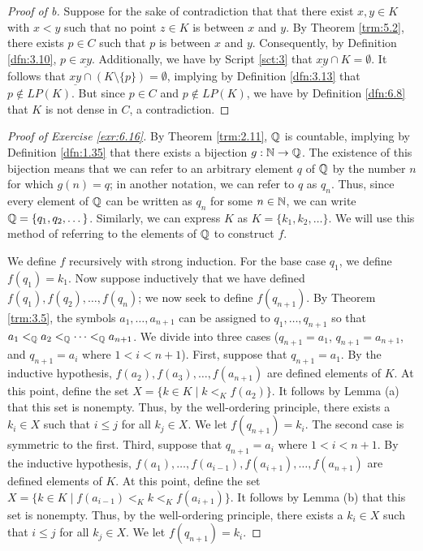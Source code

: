 \documentclass[../main.tex]{subfiles}
\begin{document}
\begin{exercise}
\begin{lemma*}
\begin{proof}[Proof of b]
            Suppose for the sake of contradiction that that there exist $x,y\in K$ with $x<y$ such that no point $z\in K$ is between $x$ and $y$. By Theorem \ref{trm:5.2}, there exists $p\in C$ such that $p$ is between $x$ and $y$. Consequently, by Definition \ref{dfn:3.10}, $p\in\underline{xy}$. Additionally, we have by Script \ref{sct:3} that $\underline{xy}\cap K=\emptyset$. It follows that $\underline{xy}\cap(K\setminus\{p\})=\emptyset$, implying by Definition \ref{dfn:3.13} that $p\notin LP(K)$. But since $p\in C$ and $p\notin LP(K)$, we have by Definition \ref{dfn:6.8} that $K$ is not dense in $C$, a contradiction.
        \end{proof}
    \end{lemma*}
    \begin{proof}[Proof of Exercise \ref{exr:6.16}]
        By Theorem \ref{trm:2.11}, $\mathbb{Q}$ is countable, implying by Definition \ref{dfn:1.35} that there exists a bijection $g:\mathbb{N}\to\mathbb{Q}$. The existence of this bijection means that we can refer to an arbitrary element $q$ of $\mathbb{Q}$ by the number $n$ for which $g(n)=q$; in another notation, we can refer to $q$ as $q_n$. Thus, since every element of $\mathbb{Q}$ can be written as $q_n$ for some $n\in\mathbb{N}$, we can write $\mathbb{Q}=\{q_1,q_2,\dots\}$. Similarly, we can express $K$ as $K=\{k_1,k_2,\dots\}$. We will use this method of referring to the elements of $\mathbb{Q}$ to construct $f$.\par
        We define $f$ recursively with strong induction. For the base case $q_1$, we define $f(q_1)=k_1$. Now suppose inductively that we have defined $f(q_1),f(q_2),\dots,f(q_n)$; we now seek to define $f(q_{n+1})$. By Theorem \ref{trm:3.5}, the symbols $a_1,\dots,a_{n+1}$ can be assigned to $q_1,\dots,q_{n+1}$ so that $a_1<_{\mathbb{Q}} a_2<_{\mathbb{Q}} \cdots<_{\mathbb{Q}} a_{n+1}$. We divide into three cases ($q_{n+1}=a_1$, $q_{n+1}=a_{n+1}$, and $q_{n+1}=a_i$ where $1<i<n+1$). First, suppose that $q_{n+1}=a_1$. By the inductive hypothesis, $f(a_2),f(a_3),\dots,f(a_{n+1})$ are defined elements of $K$. At this point, define the set $X=\{k\in K\mid k<_Kf(a_2)\}$. It follows by Lemma (a) that this set is nonempty. Thus, by the well-ordering principle, there exists a $k_i\in X$ such that $i\leq j$ for all $k_j\in X$. We let $f(q_{n+1})=k_i$. The second case is symmetric to the first. Third, suppose that $q_{n+1}=a_i$ where $1<i<n+1$. By the inductive hypothesis, $f(a_1),\dots,f(a_{i-1}),f(a_{i+1}),\dots,f(a_{n+1})$ are defined elements of $K$. At this point, define the set $X=\{k\in K\mid f(a_{i-1})<_Kk<_Kf(a_{i+1})\}$. It follows by Lemma (b) that this set is nonempty. Thus, by the well-ordering principle, there exists a $k_i\in X$ such that $i\leq j$ for all $k_j\in X$. We let $f(q_{n+1})=k_i$.\par\smallskip

\end{proof}
\end{exercise}
\end{document}
